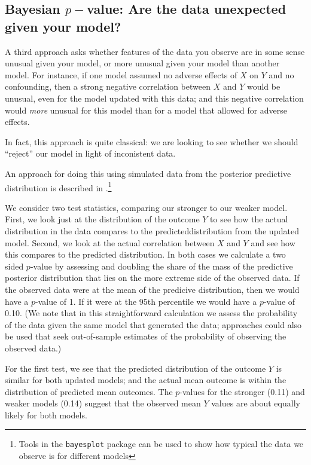 \documentclass[
  12pt,
]{book}
\begin{document}
\hypertarget{bayesian-p-value-are-the-data-unexpected-given-your-model}{%
\subsection{\texorpdfstring{Bayesian \(p-\)value: Are the data unexpected given your model?}{Bayesian p-value: Are the data unexpected given your model?}}\label{bayesian-p-value-are-the-data-unexpected-given-your-model}}

A third approach asks whether features of the data you observe are in some sense unusual given your model, or more unusual given your model than another model. For instance, if one model assumed no adverse effects of \(X\) on \(Y\) and no confounding, then a strong negative correlation between \(X\) and \(Y\) would be unusual, even for the model updated with this data; and this negative correlation would \emph{more} unusual for this model than for a model that allowed for adverse effects.

In fact, this approach is quite classical: we are looking to see whether we should ``reject'' our model in light of inconistent data.

An approach for doing this using simulated data from the posterior predictive distribution is described in \citet{gabry2019visualization}.\footnote{Tools in the \texttt{bayesplot} package can be used to show how typical the data we observe is for different models}

We consider two test statistics, comparing our stronger to our weaker model. First, we look just at the distribution of the outcome \(Y\) to see how the actual distribution in the data compares to the predicteddistribution from the updated model. Second, we look at the actual correlation between \(X\) and \(Y\) and see how this compares to the predicted distribution. In both cases we calculate a two sided \(p\)-value by assessing and doubling the share of the mass of the predictive posterior distribution that lies on the more extreme side of the observed data. If the observed data were at the mean of the predicive distribution, then we would have a \(p\)-value of 1. If it were at the 95th percentile we would have a \(p\)-value of 0.10. (We note that in this straightforward calculation we assess the probability of the data given the same model that generated the data; approaches could also be used that seek out-of-sample estimates of the probability of observing the observed data.)

For the first test, we see that the predicted distribution of the outcome \(Y\) is similar for both updated models; and the actual mean outcome is within the distribution of predicted mean outcomes. The \(p\)-values for the stronger (0.11) and weaker models (0.14) suggest that the observed mean \(Y\) values are about equally likely for both models.
\end{document}
